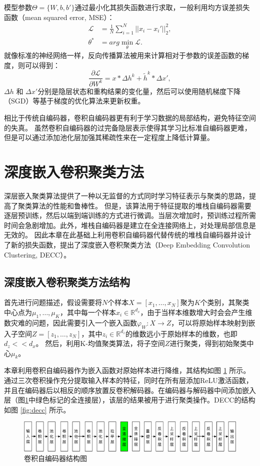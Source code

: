 模型参数$\Theta=\{{W},{b},{b'}\}$通过最小化其损失函数进行求取，一般利用均方误差损失函数（mean squared error, MSE）：
\begin{align}
	\mathscr{L} &= \frac{1}{N}\sum_{i=1}^N||x_i-x_i'||_2^2, \label{equ:mse_loss}\\
	\theta^* &= arg\min\limits_{\theta} \mathscr{L}.  \label{equ:mse}
\end{align}
就像标准的神经网络一样，反向传播算法被用来计算相对于参数的误差函数的梯度，则可以得到：
\begin{equation}
	\frac{\partial \mathscr{L}}{\partial W^k}=x * \Delta h ^k+\tilde{h}^k * \Delta x',
\end{equation}
$\Delta h$ 和 $\Delta x'$分别是隐层状态和重构结果的变化量，然后可以使用随机梯度下降（SGD）等基于梯度的优化算法来更新权重。

相比于传统自编码器，卷积自编码器更有利于学习数据的局部结构，避免特征空间的失真。
虽然卷积自编码器的过完备隐层表示使得其学习比标准自编码器更难，但是可以通过添加池化层加强其稀疏性来在一定程度上降低计算量。

\section{深度嵌入卷积聚类方法}
\label{sec:decc_method}
深层嵌入聚类算法提供了一种以无监督的方式同时学习特征表示与聚类的思路，提高了聚类算法的性能和鲁棒性。
但是，该算法用于特征提取的堆栈自编码器需要逐层预训练，然后以端到端训练的方式进行微调。当层次增加时，预训练过程所需时间会急剧增加。此外，堆栈自编码器是建立在全连接网络上，对处理局部信息是无效的。
因此本章在此基础上利用卷积自编码器代替传统的堆栈自编码器并设计了新的损失函数，提出了深度嵌入卷积聚类方法（Deep Embedding Convolution Clustering, DECC）。

\subsection{深度嵌入卷积聚类方法结构}
首先进行问题描述，假设需要将$N$个样本$X=[x_1,\dots,x_N]$聚为$K$个类别，其聚类中心点为$\mu_1,\dots,\mu_K$，其中每一个样本$x_i\in \mathbb{R}^{d_x}$，由于当样本维数增大时会会产生维数灾难的问题，因此需要引入一个嵌入函数$\varphi_W: X \rightarrow Z$，可以将原始样本映射到嵌入子空间$Z=[z_1,\dots,z_N]$，其中$z_i\in \mathbb{R}^{d_z}$的维数远小于原始样本的维数，也即$d_z<<d_x$。
然后，利用K-均值聚类算法，将子空间$Z$进行聚类，得到初始聚类中心${\mu_k}$。

本章利用卷积自编码器作为嵌入函数对原始样本进行降维，其结构如图 \ref{fig:cae} 所示。
通过三次卷积操作充分提取输入样本的特征，同时在所有层添加ReLU激活函数，并且在编码器后以相反的顺序放置反卷积解码器。在编码器与解码器中间添加嵌入层（图\ref{fig:cae}中绿色标记的全连接层），该层的结果被用于进行聚类操作。DECC的结构如图 \ref{fig:decc} 所示。
\begin{figure}[hbt]
	\centering
	\includegraphics[width=13.5cm]{figures/AE/cae}
	\caption{卷积自编码器结构图}
	\label{fig:cae}
\end{figure}

